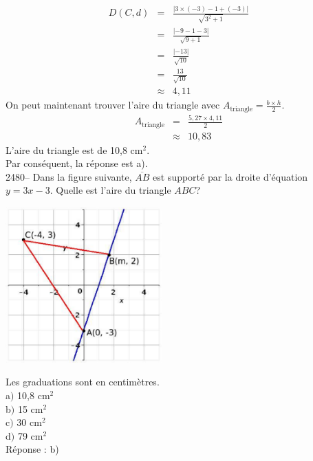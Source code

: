 \documentclass[letterpaper, 12pt]{article}
\begin{document}
\begin{eqnarray*}
 D(C, d)&=&\frac{|3\times(-3)-1+(-3) |}{\sqrt{3^{2}+1}}\\[2mm]
&=&\frac{|-9-1-3|}{\sqrt{9+1}}\\[2mm]
&=&\frac{|-13|}{\sqrt{10}}\\[2mm]
&=&\frac{13}{\sqrt{10}}\\[2mm]
&\approx&4,11
\end{eqnarray*}
On peut maintenant trouver l'aire du triangle avec $A_{\textrm{triangle}}=\frac{b\times h}{2}$.
\begin{eqnarray*}
 A_{\textrm{triangle}}&=&\frac{5,27 \times 4,11}{2}\\[2mm]
&\approx&10,83
\end{eqnarray*}
L'aire du triangle est de 10,8 cm$^{2}$.\\
Par cons\'equent, la r\'eponse est a).\\

2480-- Dans la figure suivante, $\overline{AB}$ est support\'e par la droite d'\'equation $y=3x-3$. Quelle est l'aire du triangle $ABC$?
\begin{center}
 \includegraphics[width=6cm,bb=14 14 415 415]{Q2480q.eps}
\end{center}
Les graduations sont en centim\`etres.\\

a$)$ 10,8 cm$^{2}$\\
b$)$ 15 cm$^{2}$\\
c$)$ 30 cm$^{2}$\\
d$)$ 79 cm$^{2}$\\

R\'eponse : b)\\
\end{document}
